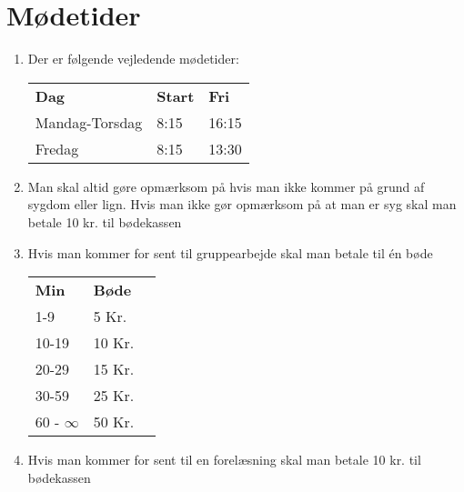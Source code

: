 \section{Mødetider}
\begin{enumerate}
\item{Der er følgende vejledende mødetider:}

\begin{tabular}{|l|l|l|}
\hline
\textbf{Dag} & \textbf{Start} & \textbf{Fri}\\ \cline{1-3}
Mandag-Torsdag & 8:15 & 16:15 \\ \cline{1-3}
Fredag & 8:15 & 13:30 \\ \cline{1-3}
\hline
\end{tabular}

\item{Man skal altid gøre opmærksom på hvis man ikke kommer på grund af sygdom eller lign. Hvis man
ikke gør opmærksom på at man er syg skal man betale 10 kr. til bødekassen}
\item{Hvis man kommer for sent til gruppearbejde skal man betale til én bøde}

\begin{tabular}{|l|l|l|}
\hline
\textbf{Min} & \textbf{Bøde} \\ \cline{1-2}
1-9 & 5 Kr. \\ \cline{1-2}
10-19 & 10 Kr. \\ \cline{1-2}
20-29 & 15 Kr. \\ \cline{1-2}
30-59 & 25 Kr. \\ \cline{1-2}
60 - $\infty$ & 50 Kr. \\ \cline{1-2}
\hline
\end{tabular}

\item{Hvis man kommer for sent til en forelæsning skal man betale 10 kr. til bødekassen}

\end{enumerate}